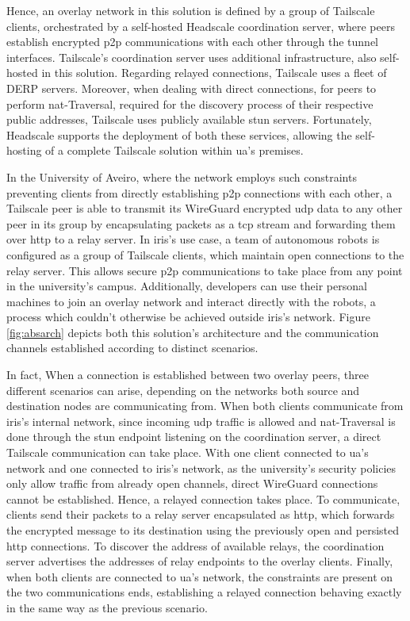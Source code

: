 \documentclass[11pt,twoside,a4paper]{report}
\begin{document}
Hence, an overlay network in this solution is defined by a group of Tailscale clients, orchestrated by a self-hosted Headscale coordination server, where peers establish encrypted \ac{p2p} communications with each other through the tunnel interfaces. Tailscale's coordination server uses additional infrastructure, also self-hosted in this solution. Regarding relayed connections, Tailscale uses a fleet of \ac{DERP} servers. Moreover, when dealing with direct connections, for peers to perform \ac{nat}-Traversal, required for the discovery process of their respective public addresses, Tailscale uses publicly available \ac{stun} servers. Fortunately, Headscale supports the deployment of both these services, allowing the self-hosting of a complete Tailscale solution within \ac{ua}'s premises.

In the University of Aveiro, where the network employs such constraints preventing clients from directly establishing \ac{p2p} connections with each other, a Tailscale peer is able to transmit its WireGuard encrypted \ac{udp} data to any other peer in its group by encapsulating packets as a \ac{tcp} stream and forwarding them over \ac{http} to a relay server. In \ac{iris}'s use case, a team of autonomous robots is configured as a group of Tailscale clients, which maintain open connections to the relay server. This allows secure \ac{p2p} communications to take place from any point in the university's campus. Additionally, developers can use their personal machines to join an overlay network and interact directly with the robots, a process which couldn't otherwise be achieved outside \ac{iris}'s network. Figure \ref{fig:absarch} depicts both this solution's architecture and the communication channels established according to distinct scenarios.

In fact, When a connection is established between two overlay peers, three different scenarios can arise, depending on the networks both source and destination nodes are communicating from. When both clients communicate from \ac{iris}'s internal network, since incoming \ac{udp} traffic is allowed and \ac{nat}-Traversal is done through the \ac{stun} endpoint listening on the coordination server, a direct Tailscale communication can take place. With one client connected to \ac{ua}'s network and one connected to \ac{iris}'s network, as the university's security policies only allow traffic from already open channels, direct WireGuard connections cannot be established. Hence, a relayed connection takes place. To communicate, clients send their packets to a relay server encapsulated as \ac{http}, which forwards the encrypted message to its destination using the previously open and persisted \ac{http} connections. To discover the address of available relays, the coordination server advertises the addresses of relay endpoints to the overlay clients. Finally, when both clients are connected to \ac{ua}'s network, the constraints are present on the two communications ends, establishing a relayed connection behaving exactly in the same way as the previous scenario.
\end{document}
